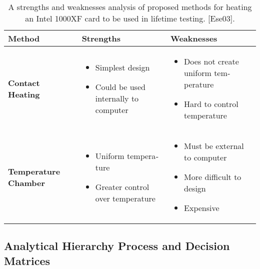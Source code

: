 \begin{table}

\caption{A strengths and weaknesses analysis of proposed
methods for heating an Intel 1000XF card to be used in lifetime testing.
{[}Ese03{]}.}
\label{table:strengthWeakIntel}
\begin{tabular}{|m{3cm}|m{5cm}|m{5cm}|}
\hline
\textbf{Method} &
\textbf{Strengths} &
\textbf{Weaknesses} \\ \hline

\textbf{Contact Heating} & 
\begin{itemize}
\item   Simplest design
\item   Could be used internally to computer
\end{itemize}   &

\begin{itemize}
\item   Does not create uniform tem­perature
\item   Hard to control tempera­ture
\end{itemize} \\ \hline

\textbf{Temperature Chamber} &
\begin{itemize}
\item  Uniform tempera­ture
\item  Greater control over tem­perature
\end{itemize}
&
\begin{itemize}
\item   Must be external to computer
\item   More difficult to design
\item   Expensive
\end{itemize}\\ \hline

\end{tabular}
\end{table}

\subsection{Analytical Hierarchy Process and Decision Matrices}
\label{subsection:analytical-hierarchy-process-and-decision-matrices}

